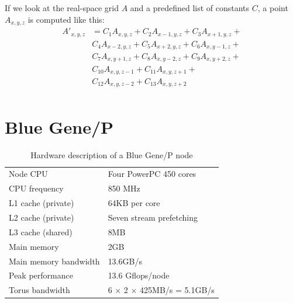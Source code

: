 \documentclass[preprint,3p,times,twocolumn]{elsarticle}
\begin{document}
If we look at the real-space grid $A$ and a predefined list of constants $C$, a point $A_{x,y,z}$ is computed like this:
\begin{displaymath}
\begin{array}{ll}
A'_{x,y,z} &= C_1 A_{x,y,z} + C_2 A_{x-1,y,z} + C_3 A_{x+1,y,z} +\\
           &  C_4 A_{x-2,y,z} + C_5 A_{x+2,y,z} + C_6 A_{x,y-1,z} +\\
           &  C_7 A_{x,y+1,z} + C_8 A_{x,y-2,z} + C_9 A_{x,y+2,z} +\\
           &  C_{10} A_{x,y,z-1} + C_{11} A_{x,y,z+1} +\\
           &  C_{12} A_{x,y,z-2} + C_{13} A_{x,y,z+2}\\
\end{array}
\end{displaymath}

\section{Blue Gene/P}
%
\begin{table}
\caption{Hardware description of a Blue Gene/P node}
\label{tab:bgp}
\centering
\begin{footnotesize}
\begin{tabular}{l l}
\hline
Node CPU & Four PowerPC 450 cores\\
CPU frequency & 850 MHz\\
L1 cache (private) & 64KB per core\\
L2 cache (private) & Seven stream pre\-fetching\\
L3 cache (shared) & 8MB\\
Main memory & 2GB\\
Main memory bandwidth & 13.6GB/s\\
Peak performance & 13.6 Gflops/node\\
Torus bandwidth & 6 $\times$ 2 $\times$ 425MB/s = 5.1GB/s\\
\hline
\end{tabular}
\end{footnotesize}
\end{table}
\end{document}
